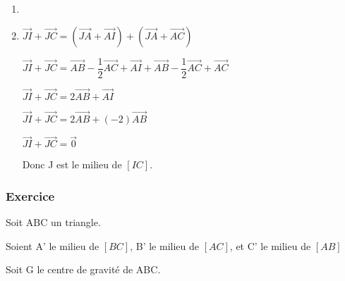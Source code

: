 \begin{enumerate}

 \item ~ \\%
 

\vspace*{1cm}


\item $\overrightarrow{JI} + \overrightarrow{JC} = \left(\overrightarrow{JA} + \overrightarrow{AI}\right) + \left(\overrightarrow{JA} + \overrightarrow{AC}\right) $

$ \overrightarrow{JI} + \overrightarrow{JC} = \overrightarrow{AB} - \dfrac{1}{2} \overrightarrow{AC} + \overrightarrow{AI} +\overrightarrow{AB} - \dfrac{1}{2} \overrightarrow{AC} + \overrightarrow{AC} $

$\overrightarrow{JI} + \overrightarrow{JC} = 2\overrightarrow{AB} + \overrightarrow{AI} $

$ \overrightarrow{JI} + \overrightarrow{JC} = 2\overrightarrow{AB} + \left(-2\right)\overrightarrow{AB} $

$ \overrightarrow{JI} + \overrightarrow{JC} = \overrightarrow{0} $

Donc J est le milieu de $\left[IC\right]$.

\end{enumerate}

\newpage
\subsubsection{Exercice }

Soit ABC un triangle.

Soient A' le milieu de $\left[BC\right]$, B' le milieu de $\left[AC\right]$, et C' le milieu de $\left[AB\right]$

Soit G le centre de gravité de ABC.

